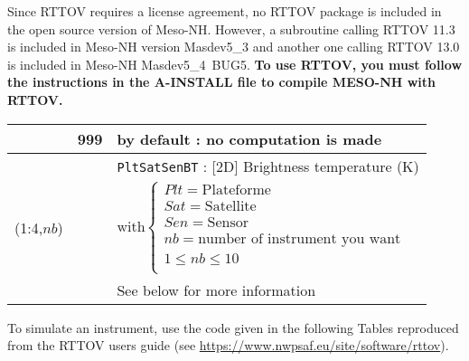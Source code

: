 Since RTTOV requires a license agreement, no RTTOV package is included in the open source version of Meso-NH. However, a subroutine calling RTTOV 11.3 is included in Meso-NH version Masdev5\_3 and another one calling RTTOV 13.0 is included in Meso-NH Masdev5\_4~BUG5. {\bf To use RTTOV, you must follow the instructions in the A-INSTALL file to compile MESO-NH with RTTOV.}   

\begin{center}
\begin{tabular}{|>{\centering}p{3.1cm}|>{\centering}p{2.4cm}|p{11cm}|}
\hline
\multirow{5}{*}{NRTTOVinfo}\index{NRTTOVinfo!\innam{NAM\_DIAG}}&\textbf{999} & by default : no computation is made\\\cline{2-3}
& \multirow{4}{*}{$Plt$ $Sat$ $Sen$ 0 } &{\tt PltSatSenBT} : [2D] Brightness temperature (K)\\
(1:4,$nb$)& & 
$
\textrm{with}
\left\{
\begin{array}{l}
Plt = \textrm{Plateforme}\\
Sat = \textrm{Satellite}\\
Sen = \textrm{Sensor}\\ 
nb =  \textrm{number of instrument you want}\\
 1\leq nb\leq10\\
\end{array}
\right.
$
\\ 
& & See below for more information\\\hline 
\end{tabular}
\end{center}


\vspace{0.5cm}
To simulate an instrument, use the code given in the following Tables reproduced from the RTTOV users guide (see \url{https://www.nwpsaf.eu/site/software/rttov}). 

